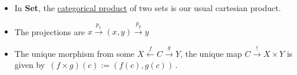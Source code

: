 \begin{itemize}
    \item  In \textbf{Set}, the \href{doc/1 math/Seven Sketches in Compositionality/Chapter 3: Databases/5 Introduction to limits and colimits/1 Terminal objects and products/2 Product}{categorical product} of two sets is our usual cartesian product.
    \item The projections are $x \xrightarrow{p_x}(x,y)\xrightarrow{p_y}y$
    \item The unique morphism from some $X \xleftarrow{f} C \xrightarrow{g} Y$, the unique map $C \xrightarrow{!}X \times Y$ is given by \,$(f\times g)(c):=(f(c),g(c))$\,.
  \end{itemize}
